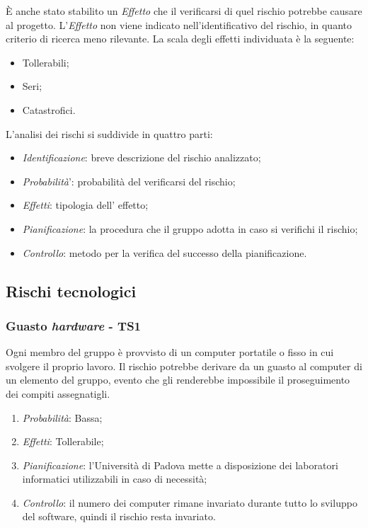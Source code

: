 \`E anche stato stabilito un \textit{Effetto} che il verificarsi di quel rischio potrebbe causare al progetto. L'\textit{Effetto} non viene indicato nell'identificativo del rischio, in quanto criterio di ricerca meno rilevante. La scala degli effetti individuata è la seguente:
\begin{itemize}
\item Tollerabili;
\item Seri;
\item Catastrofici.
\end{itemize}

L'analisi dei rischi si suddivide in quattro parti:
\begin{itemize}
\item \textit{Identificazione}: breve descrizione del rischio analizzato;
\item \textit{Probabilit\`a}': probabilit\`a del verificarsi del rischio;
\item \textit{Effetti}: tipologia dell' effetto;
\item \textit{Pianificazione}: la procedura che il gruppo adotta in caso si verifichi il rischio;
\item \textit{Controllo}: metodo per la verifica del successo della pianificazione.
\end{itemize}

\subsection{Rischi tecnologici}
\subsubsection{Guasto \textit{hardware} - TS1}
Ogni membro del gruppo \`e provvisto di un computer portatile o fisso in cui svolgere il proprio lavoro. Il rischio potrebbe derivare da un guasto al computer di un elemento del gruppo, evento che gli renderebbe impossibile il proseguimento dei compiti assegnatigli.
\begin{enumerate}
\item \textit{Probabilit\`a}: Bassa;
\item \textit{Effetti}: Tollerabile; 
\item \textit{Pianificazione}: l'Universit\`a di Padova mette a disposizione dei laboratori informatici utilizzabili
in caso di necessit\`a;
\item \textit{Controllo}: il numero dei computer rimane invariato durante tutto lo sviluppo del software, quindi il rischio resta invariato.
\end{enumerate}

